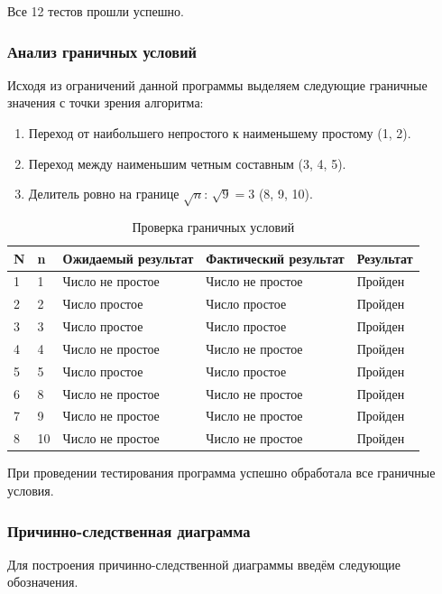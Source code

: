 \documentclass{article}[14pt]
\begin{document}
Все 12 тестов прошли успешно.

\subsubsection{Анализ граничных условий}

Исходя из ограничений данной программы выделяем следующие граничные значения с точки зрения алгоритма:

\begin{enumerate}
	\item Переход от наибольшего непростого к наименьшему простому (1, 2).
	\item Переход между наименьшим четным составным (3, 4, 5).
	\item Делитель ровно на границе $\sqrt{n}$: $\sqrt{9} = 3$ (8, 9, 10).
\end{enumerate}

{\centering\large{
	\begin{longtable}{|p{0.4cm}|p{0.8cm}|p{4.5cm}|p{4.5cm}|p{2cm}|}
		\caption{Проверка граничных условий}\\
		\hline
		N & n & Ожидаемый результат & Фактический результат & Результат \\ \hline
		1 & 1 & Число не простое & Число не простое & Пройден \\ \hline
		2 & 2 & Число простое & Число простое & Пройден \\ \hline
		3 & 3 & Число простое & Число простое & Пройден \\ \hline
		4 & 4 & Число не простое & Число не простое & Пройден \\ \hline
		5 & 5 & Число простое & Число простое & Пройден \\ \hline
		6 & 8 & Число не простое & Число не простое & Пройден \\ \hline
		7 & 9 & Число не простое & Число не простое & Пройден \\ \hline
		8 & 10 & Число не простое & Число не простое & Пройден \\ \hline
	\end{longtable}
}}

При проведении тестирования программа успешно обработала все граничные условия.

\subsubsection{Причинно-следственная диаграмма}

Для построения причинно-следственной диаграммы введём следующие обозначения.
\end{document}
